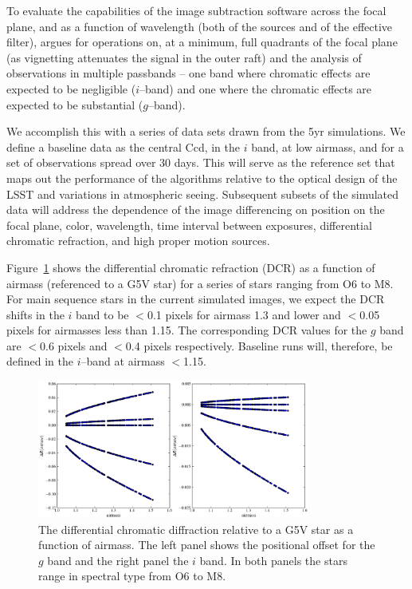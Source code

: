 \documentclass[12pt]{article}
\begin{document}
To evaluate the capabilities of the image subtraction software across
the focal plane, and as a function of wavelength (both of the sources
and of the effective filter), argues for operations on, at a minimum,
full quadrants of the focal plane (as vignetting attenuates the signal
in the outer raft) and the analysis of observations in multiple
passbands -- one band where chromatic effects are expected to be
negligible ($i$--band) and one where the chromatic effects are
expected to be substantial ($g$--band).

We accomplish this with a series of data sets drawn from the 5yr
simulations. We define a baseline data as the central Ccd, in the $i$
band, at low airmass, and for a set of observations spread
over 30 days.  This will serve as the reference set that maps out the
performance of the algorithms relative to the optical design of the
LSST and variations in atmospheric seeing. Subsequent subsets of the
simulated data will address the dependence of the image differencing
on position on the focal plane, color, wavelength, time interval
between exposures, differential chromatic refraction, and high proper
motion sources. 

Figure~\ref{DCR} shows the differential chromatic refraction (DCR) as
a function of airmass (referenced to a G5V star) for a series of stars
ranging from O6 to M8. For main sequence stars in the current
simulated images, we expect the DCR shifts in the $i$ band to be
$<$0.1 pixels for airmass 1.3 and lower and $<$0.05 pixels for
airmasses less than 1.15. The corresponding DCR values for the $g$
band are $<$0.6 pixels and $<$0.4 pixels respectively. Baseline runs
will, therefore, be defined in the $i$--band at airmass $<$1.15.

\begin{figure}
\centerline{\includegraphics[width=0.8\textwidth]{Figures/DCR_R_stars.eps}}
\caption{The differential chromatic diffraction relative to a G5V star
  as a function of airmass. The left panel shows the positional offset
  for the $g$ band and the right panel the $i$ band. In both panels
  the stars range in spectral type from O6 to M8.}
\label{DCR}
\end{figure}
\end{document}
